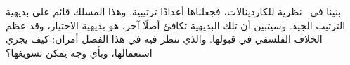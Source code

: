 \documentclass[../../../include/open-logic-section]{subfiles}
\begin{document}


بنينا في~
نظرية للكاردينالات، فجعلناها أعدادًا ترتيبية. وهذا المسلك قائم على
بديهية الترتيب الجيد. وسيتبين أن تلك البديهية تكافئ أصلًا آخر، هو
بديهية الاختيار، وقد عظم الخلاف الفلسفي في قبولها. والذي ننظر فيه في
هذا الفصل أمران: كيف يجري استعمالها، وبأي وجه يمكن تسويغها؟
\end{document}
